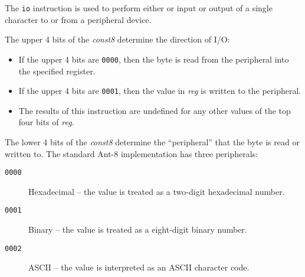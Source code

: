 



The {\tt io} instruction is used to perform either or input or output
of a single character to or from a peripheral device.

The upper 4 bits of the {\em const8} determine the direction of I/O:

\begin{itemize}

\item If the upper 4 bits are {\tt 0000}, then the byte is read from
	the peripheral into the specified register.

\item If the upper 4 bits are {\tt 0001}, then the value in {\em reg}
	is written to the peripheral.

\item The results of this instruction are undefined for any other
	values of the top four bits of {\em reg}.

\end{itemize}

The lower 4 bits of the {\em const8} determine the ``peripheral'' that
the byte is read or written to.  The standard Ant-8 implementation has three 
peripherals:

\begin{description}

\item[{\tt 0000}] Hexadecimal --
	the value is treated as a two-digit hexadecimal number.

\item[{\tt 0001}] Binary --
	the value is treated as a eight-digit binary number.

\item[{\tt 0002}] {\sc ASCII} --
	the value is interpreted as an ASCII character code.

\end{description}



